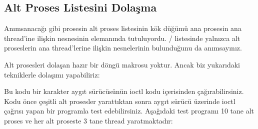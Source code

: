 \documentclass[a4paper,10pt,turkish]{sphinxmanual}
\begin{document}
\subsection{Alt Proses Listesini Dolaşma}
\label{\detokenize{processcontrolblock:alt-proses-listesini-dolasma}}
\sphinxAtStartPar
Anımsanacağı gibi prosesin alt proses listesinin kök düğümü ana prosesin ana thread’ine ilişkin
 nesnesinin  elemanında tutuluyordu. / listesinde
yalnızca alt proseslerin ana thread’lerine ilişkin  nesnelerinin bulunduğunu da
anımsayınız.

\sphinxAtStartPar
Alt prosesleri dolaşan hazır bir döngü makrosu yoktur. Ancak biz yukarıdaki tekniklerle dolaşımı
yapabiliriz:

\begin{sphinxVerbatim}[commandchars=\\\{\}]



\end{sphinxVerbatim}

\sphinxAtStartPar
Bu kodu bir karakter aygıt sürücüsünün ioctl kodu içerisinden çağırabilirsiniz. Kodu önce çeşitli alt
prosesler yarattıktan sonra aygıt sürücü üzerinde ioctl çağrısı yapan bir programla test edebilirsiniz.
Aşağıdaki test programı 10 tane alt proses ve her alt proseste 3 tane thread yaratmaktadır:
\end{document}
